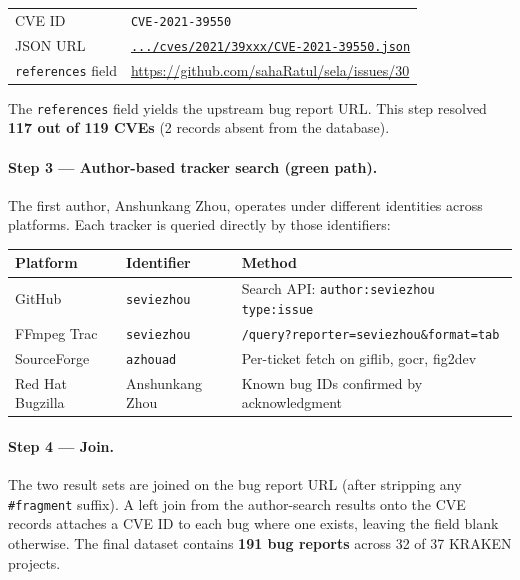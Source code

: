 \documentclass[11pt,a4paper]{article}
\begin{document}
\begin{center}
\small\renewcommand{\arraystretch}{1.3}
\begin{tabular}{@{}ll@{}}
\toprule
CVE ID   & \texttt{CVE-2021-39550} \\
JSON URL & \href{https://raw.githubusercontent.com/CVEProject/cvelistV5/main/cves/2021/39xxx/CVE-2021-39550.json}{\texttt{.../cves/2021/39xxx/CVE-2021-39550.json}} \\
\midrule
\texttt{references} field & \url{https://github.com/sahaRatul/sela/issues/30} \\
\bottomrule
\end{tabular}
\end{center}

\noindent The \texttt{references} field yields the upstream bug report URL.
This step resolved \textbf{117 out of 119 CVEs} (2 records absent from the database).

\paragraph{Step 3 --- Author-based tracker search (green path).}
The first author, Anshunkang Zhou, operates under different identities across platforms.
Each tracker is queried directly by those identifiers:

\begin{center}
\small\renewcommand{\arraystretch}{1.3}
\begin{tabular}{@{}lll@{}}
\toprule
\textbf{Platform} & \textbf{Identifier} & \textbf{Method} \\
\midrule
GitHub            & \texttt{seviezhou}    & Search API: \texttt{author:seviezhou type:issue} \\
FFmpeg Trac       & \texttt{seviezhou}    & \texttt{/query?reporter=seviezhou\&format=tab} \\
SourceForge       & \texttt{azhouad}      & Per-ticket fetch on giflib, gocr, fig2dev \\
Red Hat Bugzilla  & Anshunkang Zhou       & Known bug IDs confirmed by acknowledgment \\
\bottomrule
\end{tabular}
\end{center}

\paragraph{Step 4 --- Join.}
The two result sets are joined on the bug report URL (after stripping any
\texttt{\#fragment} suffix). A left join from the author-search results onto the CVE
records attaches a CVE ID to each bug where one exists, leaving the field blank otherwise.
The final dataset contains \textbf{191 bug reports} across 32 of 37 KRAKEN projects.
\end{document}
